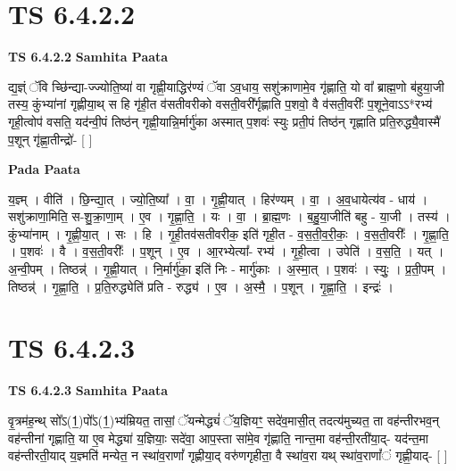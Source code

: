 \documentclass[17pt]{extarticle}
\begin{document}
\section*{ TS 6.4.2.2 }

\textbf{TS 6.4.2.2 } \newline
\textbf{Samhita Paata} \newline

द्य॒ज्ञ्ं ॅवि च्छि॑न्द्या-ज्ज्योति॒ष्या॑ वा गृह्णी॒याद्धिर॑ण्यं ॅवा ऽव॒धाय॒ सशु॑क्राणामे॒व गृ॑ह्णाति॒ यो वा᳚ ब्राह्म॒णो ब॑हुया॒जी तस्य॒ कुंभ्या॑नां गृह्णीया॒थ् स हि गृ॑ही॒त व॑सतीवरीको वसती॒वरी᳚र्गृह्णाति प॒शवो॒ वै व॑सती॒वरीः᳚ प॒शूने॒वाऽऽ*रभ्य॑ गृही॒त्वोप॑ वसति॒ यद॑न्वी॒पं तिष्ठ॑न् गृह्णी॒यान्नि॒र्मार्गु॑का अस्मात् प॒शवः॑ स्युः प्रती॒पं तिष्ठ॑न् गृह्णाति प्रति॒रुद्ध्यै॒वास्मै॑ प॒शून् गृ॑ह्णा॒तीन्द्रो॑- [  ] \newline

\textbf{Pada Paata} \newline

य॒ज्ञ्म् । वीति॑ । छि॒न्द्या॒त् । ज्यो॒ति॒ष्या᳚ । वा॒ । गृ॒ह्णी॒यात् । हिर॑ण्यम् । वा॒ । अ॒व॒धायेत्य॑व - धाय॑ । सशु॑क्राणा॒मिति॒ स-शु॒क्रा॒णा॒म् । ए॒व । गृ॒ह्णा॒ति॒ । यः । वा॒ । ब्रा॒ह्म॒णः । ब॒हु॒या॒जीति॑ बहु - या॒जी । तस्य॑ । कुंभ्या॑नाम् । गृ॒ह्णी॒या॒त् । सः । हि । गृ॒ही॒तव॑सतीवरीक॒ इति॑ गृही॒त - व॒स॒ती॒व॒री॒कः॒ । व॒स॒ती॒वरीः᳚ । गृ॒ह्णा॒ति॒ । प॒शवः॑ । वै । व॒स॒ती॒वरीः᳚ । प॒शून् । ए॒व । आ॒रभ्येत्या᳚- रभ्य॑ । गृ॒ही॒त्वा । उपेति॑ । व॒स॒ति॒ । यत् । अ॒न्वी॒पम् । तिष्ठन्न्॑ । गृ॒ह्णी॒यात् । नि॒र्मार्गु॑का॒ इति॑ निः - मार्गु॑काः । अ॒स्मा॒त् । प॒शवः॑ । स्युः॒ । प्र॒ती॒पम् । तिष्ठन्न्॑ । गृ॒ह्णा॒ति॒ । प्र॒ति॒रुद्ध्येति॑ प्रति - रुद्ध्य॑ । ए॒व । अ॒स्मै॒ । प॒शून् । गृ॒ह्णा॒ति॒ । इन्द्रः॑ ।  \newline




\section*{ TS 6.4.2.3 }

\textbf{TS 6.4.2.3 } \newline
\textbf{Samhita Paata} \newline

वृ॒त्रम॑ह॒न्थ् सो᳚ऽ(1॒)पो᳚ऽ(1॒)भ्य॑म्रियत॒ तासां॒ ॅयन्मेद्ध्यं॑ ॅय॒ज्ञियꣳ॒॒ सदे॑व॒मासी॒त् तदत्य॑मुच्यत॒ ता वह॑न्तीरभव॒न् वह॑न्तीनां गृह्णाति॒ या ए॒व मेद्ध्या॑ य॒ज्ञियाः॒ सदे॑वा॒ आप॒स्ता सा॑मे॒व गृ॑ह्णाति॒ नान्त॒मा वह॑न्ती॒रती॑या॒द्- यद॑न्त॒मा वह॑न्तीरती॒याद् य॒ज्ञ्मति॑ मन्येत॒ न स्था॑व॒राणां᳚ गृह्णीया॒द् वरु॑णगृहीता॒ वै स्था॑व॒रा यथ् स्था॑व॒राणां᳚ं गृह्णी॒याद्- [  ] \newline
\end{document}
